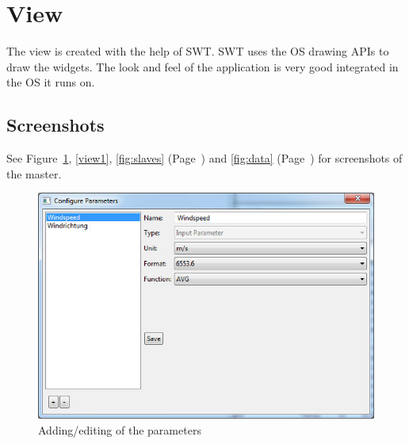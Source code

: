 
\section{View} %
\label{sec:view}

The view is created with the help of SWT. SWT uses the OS drawing APIs to draw the widgets. The look and feel of the application is very good integrated in the OS it runs on. 

\subsection{Screenshots} %
\label{sub:screenshots}
See Figure~\ref{fig:parameter}, \ref{view1}, \ref{fig:slaves} (Page~\pageref{fig:slaves}) and \ref{fig:data} (Page~\pageref{fig:data}) for screenshots of the master.

\begin{figure}[ht]
    \centering
    \includegraphics[width=0.8\linewidth]{master/parameters.jpg}
    \caption{Adding/editing of the parameters}
    \label{fig:parameter}
\end{figure} 

